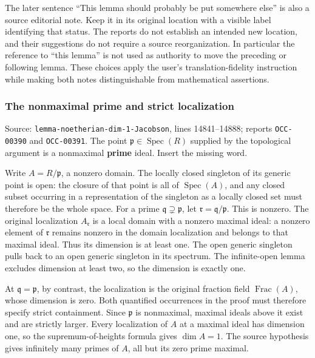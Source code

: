 The later sentence ``This lemma should probably be put somewhere else'' is also a source editorial note. Keep it in its original location with a visible label identifying that status. The reports do not establish an intended new location, and their suggestions do not require a source reorganization. In particular the reference to ``this lemma'' is not used as authority to move the preceding or following lemma. These choices apply the user's translation-fidelity instruction while making both notes distinguishable from mathematical assertions.

\subsubsection{The nonmaximal prime and strict localization}\label{the-nonmaximal-prime-and-strict-localization}

Source: \texttt{lemma-noetherian-dim-1-Jacobson}, lines 14841--14888; reports \texttt{OCC-00390} and \texttt{OCC-00391}. The point \(\mathfrak p\in\operatorname{Spec}(R)\) supplied by the topological argument is a nonmaximal \textbf{prime} ideal. Insert the missing word.

Write \(A=R/\mathfrak p\), a nonzero domain. The locally closed singleton of its generic point is open: the closure of that point is all of \(\operatorname{Spec}(A)\), and any closed subset occurring in a representation of the singleton as a locally closed set must therefore be the whole space. For a prime \(\mathfrak q\supsetneq\mathfrak p\), let \(\mathfrak r=\mathfrak q/\mathfrak p\). This is nonzero. The original localization \(A_{\mathfrak r}\) is a local domain with a nonzero maximal ideal: a nonzero element of \(\mathfrak r\) remains nonzero in the domain localization and belongs to that maximal ideal. Thus its dimension is at least one. The open generic singleton pulls back to an open generic singleton in its spectrum. The infinite-open lemma excludes dimension at least two, so the dimension is exactly one.

At \(\mathfrak q=\mathfrak p\), by contrast, the localization is the original fraction field \(\operatorname{Frac}(A)\), whose dimension is zero. Both quantified occurrences in the proof must therefore specify strict containment. Since \(\mathfrak p\) is nonmaximal, maximal ideals above it exist and are strictly larger. Every localization of \(A\) at a maximal ideal has dimension one, so the supremum-of-heights formula gives \(\dim A=1\). The source hypothesis gives infinitely many primes of \(A\), all but its zero prime maximal.

